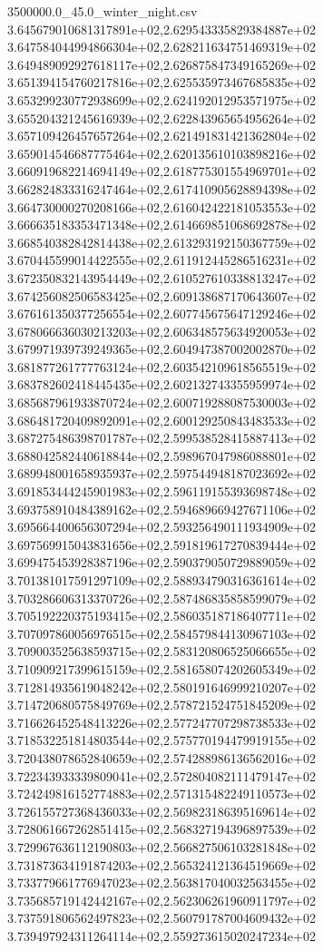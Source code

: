 \begin{filecontents*}{3500000.0_45.0_winter_night.csv}
3.645679010681317891e+02,2.629543335829384887e+02
3.647584044994866304e+02,2.628211634751469319e+02
3.649489092927618117e+02,2.626875847349165269e+02
3.651394154760217816e+02,2.625535973467685835e+02
3.653299230772938699e+02,2.624192012953571975e+02
3.655204321245616939e+02,2.622843965654956264e+02
3.657109426457657264e+02,2.621491831421362804e+02
3.659014546687775464e+02,2.620135610103898216e+02
3.660919682214694149e+02,2.618775301554969701e+02
3.662824833316247464e+02,2.617410905628894398e+02
3.664730000270208166e+02,2.616042422181053553e+02
3.666635183353471348e+02,2.614669851068692878e+02
3.668540382842814438e+02,2.613293192150367759e+02
3.670445599014422555e+02,2.611912445286516231e+02
3.672350832143954449e+02,2.610527610338813247e+02
3.674256082506583425e+02,2.609138687170643607e+02
3.676161350377256554e+02,2.607745675647129246e+02
3.678066636030213203e+02,2.606348575634920053e+02
3.679971939739249365e+02,2.604947387002002870e+02
3.681877261777763124e+02,2.603542109618565519e+02
3.683782602418445435e+02,2.602132743355959974e+02
3.685687961933870724e+02,2.600719288087530003e+02
3.686481720409892091e+02,2.600129250843483533e+02
3.687275486398701787e+02,2.599538528415887413e+02
3.688042582440618844e+02,2.598967047986088801e+02
3.689948001658935937e+02,2.597544948187023692e+02
3.691853444245901983e+02,2.596119155393698748e+02
3.693758910484389162e+02,2.594689669427671106e+02
3.695664400656307294e+02,2.593256490111934909e+02
3.697569915043831656e+02,2.591819617270839444e+02
3.699475453928387196e+02,2.590379050729889059e+02
3.701381017591297109e+02,2.588934790316361614e+02
3.703286606313370726e+02,2.587486835858599079e+02
3.705192220375193415e+02,2.586035187186407711e+02
3.707097860056976515e+02,2.584579844130967103e+02
3.709003525638593715e+02,2.583120806525066655e+02
3.710909217399615159e+02,2.581658074202605349e+02
3.712814935619048242e+02,2.580191646999210207e+02
3.714720680575849769e+02,2.578721524751845209e+02
3.716626452548413226e+02,2.577247707298738533e+02
3.718532251814803544e+02,2.575770194479919155e+02
3.720438078652840659e+02,2.574288986136562016e+02
3.722343933339809041e+02,2.572804082111479147e+02
3.724249816152774883e+02,2.571315482249110573e+02
3.726155727368436033e+02,2.569823186395169614e+02
3.728061667262851415e+02,2.568327194396897539e+02
3.729967636112190803e+02,2.566827506103281848e+02
3.731873634191874203e+02,2.565324121364519669e+02
3.733779661776947023e+02,2.563817040032563455e+02
3.735685719142442167e+02,2.562306261960911797e+02
3.737591806562497823e+02,2.560791787004609432e+02
3.739497924311264114e+02,2.559273615020247234e+02

\end{filecontents*}
